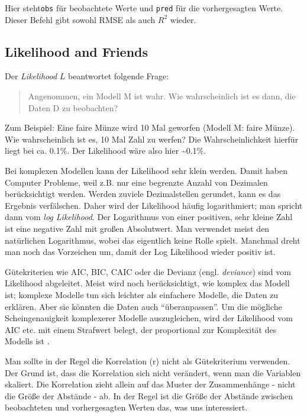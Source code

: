 \documentclass[12pt,ngerman,]{book}
\let\BeginKnitrBlock\begin \let\EndKnitrBlock\end
\begin{document}
Hier steht\texttt{obs} für beobachtete Werte und \texttt{pred} für die
vorhergesagten Werte. Dieser Befehl gibt sowohl RMSE als auch \(R^2\)
wieder.

\subsection{Likelihood and Friends}\label{likelihood-and-friends}

Der \emph{Likelihood} \(L\) beantwortet folgende Frage:

\begin{quote}
Angenommen, ein Modell M ist wahr. Wie wahrscheinlich ist es dann, die
Daten D zu beobachten?
\end{quote}

Zum Beispiel: Eine faire Münze wird 10 Mal geworfen (Modell M: faire
Münze). Wie wahrscheinlich ist es, 10 Mal Zahl zu werfen? Die
Wahrscheinlichkeit hierfür liegt bei ca. 0.1\%. Der Likelihood wäre also
hier \textasciitilde{}0.1\%.

Bei komplexen Modellen kann der Likelihood sehr klein werden. Damit
haben Computer Probleme, weil z.B. nur eine begrenzte Anzahl von
Dezimalen berücksichtigt werden. Werden zuviele Dezimalstellen gerundet,
kann es das Ergebnis verfälschen. Daher wird der Likelihood häufig
logarithmiert; man spricht dann vom \emph{log Likelihood}. Der
Logarithmus von einer positiven, sehr kleine Zahl ist eine negative Zahl
mit großen Absolutwert. Man verwendet meist den natürlichen Logarithmus,
wobei das eigentlich keine Rolle spielt. Manchmal dreht man noch das
Vorzeichen um, damit der Log Likelihood wieder positiv ist.

Gütekriterien wie AIC, BIC, CAIC oder die Devianz (engl.
\emph{deviance}) sind vom Likelihood abgeleitet. Meist wird noch
berücksichtigt, wie komplex das Modell ist; komplexe Modelle tun sich
leichter als einfachere Modelle, die Daten zu erklären. Aber sie könnten
die Daten auch ``überanpassen''. Um die mögliche Scheingenauigkeit
komplexerer Modelle auszugleichen, wird der Likelihood vom AIC etc. mit
einem Strafwert belegt, der proportional zur Komplexität des Modells ist
\citep{zumel2014practical}.

\BeginKnitrBlock{rmdcaution}
Man sollte in der Regel die Korrelation (r) nicht als Gütekriterium
verwenden. Der Grund ist, dass die Korrelation sich nicht verändert,
wenn man die Variablen skaliert. Die Korrelation zieht allein auf das
Muster der Zusammenhänge - nicht die Größe der Abstände - ab. In der
Regel ist die Größe der Abstände zwischen beobachteten und
vorhergesagten Werten das, was uns interessiert.
\EndKnitrBlock{rmdcaution}
\end{document}
